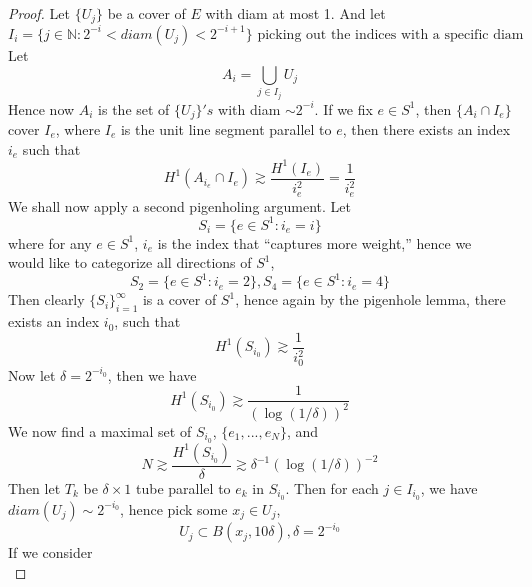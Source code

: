 \begin{proof}
    Let $\{U_j\}$ be a cover of $E$ with diam at most 1. And let 
    \begin{equation*}
        I_i=\{j\in\mathbb{N}: 2^{-i}<diam(U_j)<2^{-i+1}\} \text{ picking out the indices with a specific diam}
    \end{equation*}
    Let 
    \begin{equation*}
        A_i=\bigcup_{j\in I_j}U_j
    \end{equation*}
    Hence now $A_i$ is the set of $\{U_j\}'s$ with diam $\sim 2^{-i}$. If we fix $e\in S^1$, then $\{A_i\cap I_e\}$ cover $I_e$, where $I_e$ is the unit line segment parallel to $e$, then there exists an index $i_e$ such that 
    \begin{equation*}
        H^1(A_{i_e}\cap I_e)\gtrsim\frac{H^1(I_e)}{i_e^2}=\frac{1}{i_e^2}
    \end{equation*}
    We shall now apply a second pigenholing argument. Let 
    \begin{equation*}
        S_i=\{e\in S^1: i_e=i\}
    \end{equation*}
    where for any $e\in S^1$, $i_e$ is the index that ``captures more weight,'' hence we would like to categorize all directions of $S^1$,
    \begin{equation*}
        S_2=\{e\in S^1: i_e=2\}, S_4=\{e\in S^1: i_e=4\}
    \end{equation*}
    Then clearly $\{S_i\}_{i=1}^\infty$ is a cover of $S^1$, hence again by the pigenhole lemma, there exists an index $i_0$, such that 
    \begin{equation*}
        H^1(S_{i_0})\gtrsim\frac{1}{i_0^2}
    \end{equation*}
    Now let $\delta=2^{-i_0}$, then we have 
    \begin{equation*}
        H^1(S_{i_0})\gtrsim\frac{1}{(\log(1/\delta))^2}
    \end{equation*}
    We now find a maximal set of $S_{i_0}$, $\{e_1, ..., e_N\}$, and 
    \begin{equation*}
        N\gtrsim\frac{H^1(S_{i_0})}{\delta}\gtrsim\delta^{-1}(\log(1/\delta))^{-2}
    \end{equation*}
    Then let $T_k$ be $\delta\times 1$ tube parallel to $e_k$ in $S_{i_0}$. Then for each $j\in I_{i_0}$, we have $diam(U_j)\sim 2^{-i_0}$, hence pick some $x_j\in U_j$,
    \begin{equation*}
        U_j\subset B(x_j, 10\delta), \delta=2^{-i_0}
    \end{equation*}
    If we consider 
    \begin{equation*}

\end{equation*}
\end{proof}
